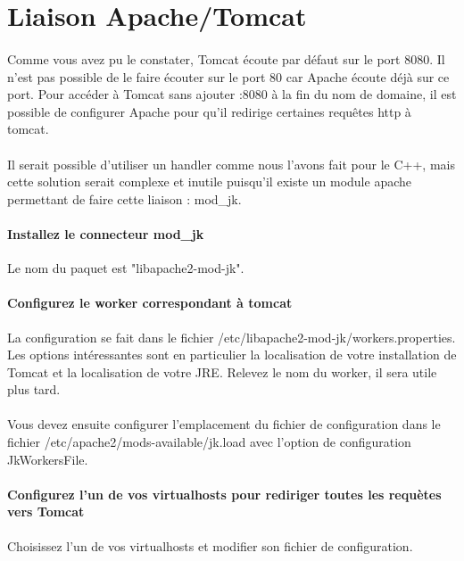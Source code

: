 \documentclass[12pt,a4paper]{article}
\begin{document}
\section{Liaison Apache/Tomcat}

\paragraph{}
Comme vous avez pu le constater, Tomcat écoute par défaut sur le port 8080. Il n'est pas possible de le faire écouter sur le port 80 car Apache écoute déjà sur ce port. Pour accéder à Tomcat sans ajouter :8080 à la fin du nom de domaine, il est possible de configurer Apache pour qu'il redirige certaines requêtes http à tomcat.

\paragraph{}
Il serait possible d'utiliser un handler comme nous l'avons fait pour le C++, mais cette solution serait complexe et inutile puisqu'il existe un module apache permettant de faire cette liaison : mod\_jk.

\paragraph{Installez le connecteur mod\_jk\\}
Le nom du paquet est "libapache2-mod-jk". 

\paragraph{Configurez le worker correspondant à tomcat\\}
La configuration se fait dans le fichier /etc/libapache2-mod-jk/workers.properties. Les options intéressantes sont en particulier la localisation de votre installation de Tomcat et la localisation de votre JRE. Relevez le nom du worker, il sera utile plus tard.

\paragraph{}
Vous devez ensuite configurer l'emplacement du fichier de configuration dans le fichier /etc/apache2/mods-available/jk.load avec l'option de configuration JkWorkersFile.

\paragraph{Configurez l'un de vos virtualhosts pour rediriger toutes les requètes vers Tomcat\\}
Choisissez l'un de vos virtualhosts et modifier son fichier de configuration.
\end{document}
